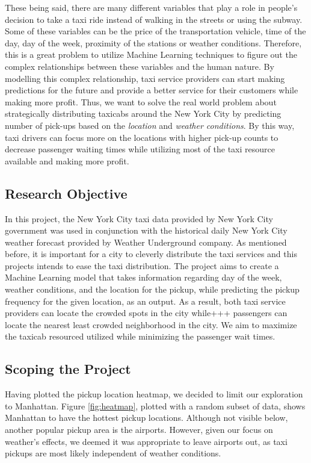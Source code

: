 \documentclass[journal, 12pt]{IEEEtran}
\begin{document}
\noindent These being said, there are many different variables that play a role in people's decision to take a taxi ride instead of walking in the streets or using the subway. Some of these variables can be the price of the transportation vehicle, time of the day, day of the week, proximity of the stations or weather conditions. Therefore, this is a great problem to utilize Machine Learning techniques to figure out the complex relationships between these variables and the human nature. By modelling this complex relationship, taxi service providers can start making predictions for the future and provide a better service for their customers while making more profit. Thus, we want to solve the real world problem about strategically distributing taxicabs around the New York City by predicting number of pick-ups based on the \textit{location} and \textit{weather conditions}. By this way, taxi drivers can focus more on the locations with higher pick-up counts to decrease passenger waiting times while utilizing most of the taxi resource available and making more profit.

\subsection{Research Objective}
\noindent In this project, the New York City taxi data provided by New York City government was used in conjunction with the historical daily New York City weather forecast provided by Weather Underground company. As mentioned before, it is important for a city to cleverly distribute the taxi services and this projects intends to ease the taxi distribution. The project aims to create a Machine Learning model that takes information regarding day of the week, weather conditions, and the location for the pickup, while predicting the pickup frequency for the given location, as an output. As a result, both taxi service providers can locate the crowded spots in the city while+++ passengers can locate the nearest least crowded neighborhood in the city. We aim to maximize the taxicab resourced utilized while minimizing the passenger wait times.


\subsection{Scoping the Project}
\noindent Having plotted the pickup location heatmap, we decided to limit our exploration to Manhattan. Figure \ref{fig:heatmap}, plotted with a random subset of data, shows Manhattan to have the hottest pickup locations. Although not visible below, another popular pickup area is the airports. However, given our focus on weather's effects, we deemed it was appropriate to leave airports out, as taxi pickups are most likely independent of weather conditions.\\
\end{document}
